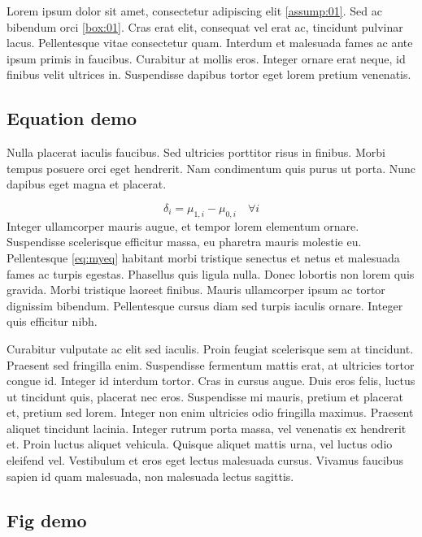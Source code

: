 \documentclass[11pt, a4paper]{report}
\begin{document}
\par Lorem ipsum dolor sit amet, consectetur adipiscing elit \ref{assump:01}. Sed ac bibendum orci \ref{box:01}. Cras erat elit, consequat vel erat ac, tincidunt pulvinar lacus. Pellentesque vitae consectetur quam. Interdum et malesuada fames ac ante ipsum primis in faucibus. Curabitur at mollis eros. Integer ornare erat neque, id finibus velit ultrices in. Suspendisse dapibus tortor eget lorem pretium venenatis. 

\subsection{Equation demo} \label{sec:intro:1}

\par Nulla placerat iaculis faucibus. Sed ultricies porttitor risus in finibus. Morbi tempus posuere orci eget hendrerit. Nam condimentum quis purus ut porta. Nunc dapibus eget magna et placerat.

\begin{equation} %
		\label{eq:myeq}
		\delta_{i} = \mu_{1, i} - \mu_{0, i} \quad \forall i 
\end{equation}
Integer ullamcorper mauris augue, et tempor lorem elementum ornare. Suspendisse scelerisque efficitur massa, eu pharetra mauris molestie eu. Pellentesque \eqref{eq:myeq} habitant morbi tristique senectus et netus et malesuada fames ac turpis egestas. Phasellus quis ligula nulla. Donec lobortis non lorem quis gravida. Morbi tristique laoreet finibus. Mauris ullamcorper ipsum ac tortor dignissim bibendum. Pellentesque cursus diam sed turpis iaculis ornare. Integer quis efficitur nibh.

\par Curabitur vulputate ac elit sed iaculis. Proin feugiat scelerisque sem at tincidunt. Praesent sed fringilla enim. Suspendisse fermentum mattis erat, at ultricies tortor congue id. Integer id interdum tortor. Cras in cursus augue. Duis eros felis, luctus ut tincidunt quis, placerat nec eros. Suspendisse mi mauris, pretium et placerat et, pretium sed lorem. Integer non enim ultricies odio fringilla maximus. Praesent aliquet tincidunt lacinia. Integer rutrum porta massa, vel venenatis ex hendrerit et. Proin luctus aliquet vehicula. Quisque aliquet mattis urna, vel luctus odio eleifend vel. Vestibulum et eros eget lectus malesuada cursus. Vivamus faucibus sapien id quam malesuada, non malesuada lectus sagittis. 

\subsection{Fig demo} \label{sec:intro:2}
\end{document}
